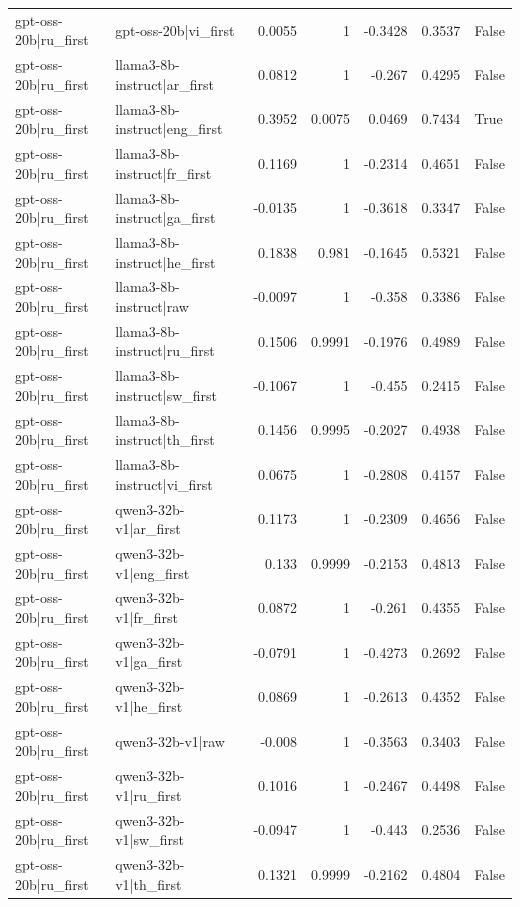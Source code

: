 \begin{table}
\begin{tabular}{l l r r r r l}
gpt-oss-20b|ru_first & gpt-oss-20b|vi_first & 0.0055 & 1 & -0.3428 & 0.3537 & False \\
gpt-oss-20b|ru_first & llama3-8b-instruct|ar_first & 0.0812 & 1 & -0.267 & 0.4295 & False \\
gpt-oss-20b|ru_first & llama3-8b-instruct|eng_first & 0.3952 & 0.0075 & 0.0469 & 0.7434 & True \\
gpt-oss-20b|ru_first & llama3-8b-instruct|fr_first & 0.1169 & 1 & -0.2314 & 0.4651 & False \\
gpt-oss-20b|ru_first & llama3-8b-instruct|ga_first & -0.0135 & 1 & -0.3618 & 0.3347 & False \\
gpt-oss-20b|ru_first & llama3-8b-instruct|he_first & 0.1838 & 0.981 & -0.1645 & 0.5321 & False \\
gpt-oss-20b|ru_first & llama3-8b-instruct|raw & -0.0097 & 1 & -0.358 & 0.3386 & False \\
gpt-oss-20b|ru_first & llama3-8b-instruct|ru_first & 0.1506 & 0.9991 & -0.1976 & 0.4989 & False \\
gpt-oss-20b|ru_first & llama3-8b-instruct|sw_first & -0.1067 & 1 & -0.455 & 0.2415 & False \\
gpt-oss-20b|ru_first & llama3-8b-instruct|th_first & 0.1456 & 0.9995 & -0.2027 & 0.4938 & False \\
gpt-oss-20b|ru_first & llama3-8b-instruct|vi_first & 0.0675 & 1 & -0.2808 & 0.4157 & False \\
gpt-oss-20b|ru_first & qwen3-32b-v1|ar_first & 0.1173 & 1 & -0.2309 & 0.4656 & False \\
gpt-oss-20b|ru_first & qwen3-32b-v1|eng_first & 0.133 & 0.9999 & -0.2153 & 0.4813 & False \\
gpt-oss-20b|ru_first & qwen3-32b-v1|fr_first & 0.0872 & 1 & -0.261 & 0.4355 & False \\
gpt-oss-20b|ru_first & qwen3-32b-v1|ga_first & -0.0791 & 1 & -0.4273 & 0.2692 & False \\
gpt-oss-20b|ru_first & qwen3-32b-v1|he_first & 0.0869 & 1 & -0.2613 & 0.4352 & False \\
gpt-oss-20b|ru_first & qwen3-32b-v1|raw & -0.008 & 1 & -0.3563 & 0.3403 & False \\
gpt-oss-20b|ru_first & qwen3-32b-v1|ru_first & 0.1016 & 1 & -0.2467 & 0.4498 & False \\
gpt-oss-20b|ru_first & qwen3-32b-v1|sw_first & -0.0947 & 1 & -0.443 & 0.2536 & False \\
gpt-oss-20b|ru_first & qwen3-32b-v1|th_first & 0.1321 & 0.9999 & -0.2162 & 0.4804 & False \\

\end{tabular}
\end{table}
